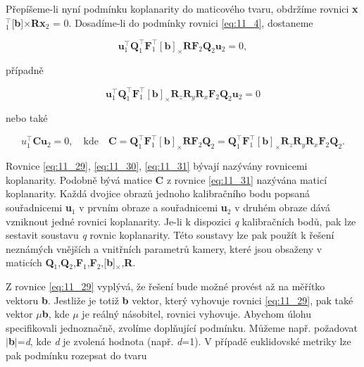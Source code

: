 Přepíšeme-li nyní podmínku koplanarity do maticového tvaru, obdržíme rovnici \textbf{x}$_1^\top$[\textbf{b}]$\times$\textbf{Rx}$_2$ = 0. Dosadíme-li do podmínky rovnici \eqref{eq:11_4}, dostaneme

\begin{equation} \label{eq:11_29}
    \mathbf{u}_{1}^\top \mathbf{Q}_{1}^\top \mathbf{F}_{1}^\top \left[ \mathbf{b} \right]_{\times } \mathbf{RF}_{2} \mathbf{Q}_{2} \mathbf{u}_{2} =0,
\end{equation}

případně

\begin{equation} \label{eq:11_30}
    \mathbf{u}_{1}^\top \mathbf{Q}_{1}^\top \mathbf{F}_{1}^\top \left[ \mathbf{b} \right]_{\times} \mathbf{R}_{z} \mathbf{R}_{y} \mathbf{R}_{x} \mathbf{F}_{2} \mathbf{Q}_{2} \mathbf{u}_{2} = 0
\end{equation}

nebo také

\begin{equation} \label{eq:11_31}
    u_{1}^\top \mathbf{Cu}_{2} = 0, \quad \mathrm{kde} \quad \mathbf{C} = \mathbf{Q}_{1}^\top \mathbf{F}_{1}^\top \left[ \mathbf{b} \right]_{\times} \mathbf{RF}_{2} \mathbf{Q}_{2} = \mathbf{Q}_{1}^\top \mathbf{F}_{1}^\top \left[ \mathbf{b} \right]_{\times} \mathbf{R}_{z} \mathbf{R}_{y} \mathbf{R}_{x} \mathbf{F}_{2} \mathbf{Q}_{2}.
\end{equation}

Rovnice \eqref{eq:11_29}, \eqref{eq:11_30}, \eqref{eq:11_31} bývají nazývány rovnicemi koplanarity. Podobně bývá matice \textbf{C} z rovnice \eqref{eq:11_31} nazývána maticí koplanarity. Každá dvojice obrazů jednoho kalibračního bodu popsaná souřadnicemi \textbf{u}$_1$ v prvním obraze a souřadnicemi \textbf{u}$_2$ v druhém obraze dává vzniknout jedné rovnici koplanarity. Je-li k dispozici \textit{q} kalibračních bodů, pak lze sestavit soustavu \textit{q} rovnic koplanarity. Této soustavy lze pak použít k řešení neznámých vnějších a vnitřních parametrů kamery, které jsou obsaženy v maticích \textbf{Q}$_1$,\textbf{Q}$_2$,\textbf{F}$_1$,\textbf{F}$_2$,[\textbf{b}]$_\times$,\textbf{R}.

Z rovnice \eqref{eq:11_29} vyplývá, že řešení bude možné provést až na měřítko vektoru \textbf{b}. Jestliže je totiž \textbf{b} vektor, který vyhovuje rovnici \eqref{eq:11_29}, pak také vektor $\mu$\textbf{b}, kde $\mu$ je reálný násobitel, rovnici vyhovuje. Abychom úlohu specifikovali jednoznačně, zvolíme doplňující podmínku. Můžeme např. požadovat $\mid$\textbf{b}$\mid$=\textit{d}, kde \textit{d} je zvolená hodnota (např. \textit{d}=1). V případě euklidovské metriky lze pak podmínku rozepsat do tvaru

